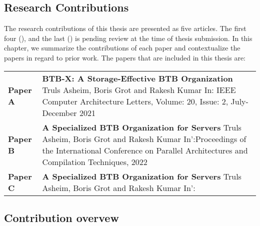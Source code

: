 \documentclass[../main.tex]{subfiles}
\begin{document}
\ifx\chapincluded\undefined
  \begin{refsection}
 \fi

\chapter{Research Contributions}
\label{chap:rcontrib}

The research contributions of this thesis are presented as five articles. The first four (), and the last () is pending review at the time of thesis submission. In this chapter, we summarize the contributions of each paper and contextualize the papers in regard to prior work. The papers that are included in this thesis are:

\vspace*{0.8cm}

\noindent
\begin{tabular}{lp{}}
\textbf{Paper A} & \textbf{BTB-X: A Storage-Effective BTB Organization} \newline
                     Truls Asheim, Boris Grot and Rakesh Kumar \newline
                     In: IEEE Computer Architecture Letters, Volume: 20, Issue: 2, July-December 2021
                     \vspace*{0.3cm} \\
\textbf{Paper B} & \textbf{A Specialized BTB Organization for Servers} \newline
                     Truls Asheim, Boris Grot and Rakesh Kumar \newline
                     In':Proceedings of the International Conference on Parallel Architectures and Compilation Techniques, 2022
                     \vspace*{0.3cm} \\
\textbf{Paper C} & \textbf{A Specialized BTB Organization for Servers} \newline
                     Truls Asheim, Boris Grot and Rakesh Kumar \newline
                     In': 
                     \vspace*{0.3cm} \\

\end{tabular}


\section{Contribution overvew}


\end{refsection}
\end{document}
